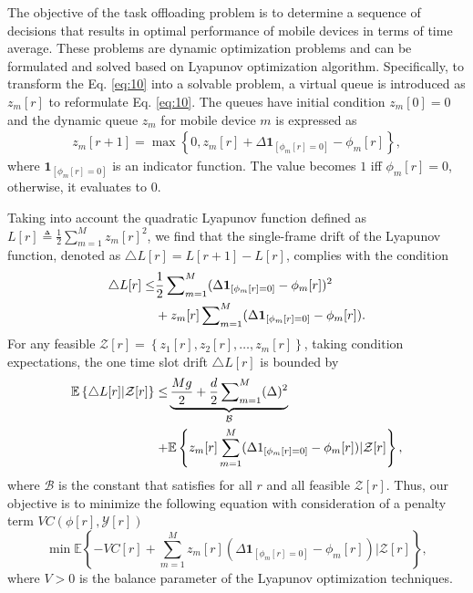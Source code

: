 \documentclass[journal]{IEEEtran}
\begin{document}
The objective of the task offloading problem is to determine a sequence of decisions that results in optimal performance of mobile devices in terms of time average.
These problems are dynamic optimization problems and can be formulated and solved based on Lyapunov optimization algorithm.
Specifically, to transform the Eq. \eqref{eq:10} into a solvable problem, a virtual queue is introduced as $z_m[r]$ to reformulate Eq. \eqref{eq:10}.
The queues have initial condition $z_m[0]=0$ and the dynamic queue $z_m$ for mobile device $m$ is expressed as
\begin{align}\label{eq:12-1}
z_m[r+1]=\max\left\{0,z_m[r]+\Delta{\boldsymbol 1}_{\left[\phi_m[r]=0\right]}-\phi_m[r]\right\},
\end{align}
where ${\boldsymbol 1}_{\left[\phi_m[r]=0\right]}$ is an indicator function. The value becomes $1$ iff $\phi_m[r]=0$, otherwise, it evaluates to $0$.

Taking into account the quadratic Lyapunov function defined as $L[r]\triangleq \frac{1}{2} \sum_{m=1}^{M}z_m[r]^2$, we find that the single-frame drift of the Lyapunov function, denoted as $\triangle L[r]=L[r+1]-L[r]$, complies with the condition
\begin{align}
\triangle L[r] \le& \frac{1}{2}\sum\nolimits_{m=1}^{M}(\Delta {\boldsymbol 1}_{[\phi_m[r]=0]}-\phi_m[r])^2\\
&+z_m[r]\sum\nolimits_{m=1}^{M}(\Delta {\boldsymbol 1}_{[\phi_m[r]=0]}-\phi_m[r]).\notag
\end{align}
For any feasible $\mathcal{Z}[r]=\left\{z_1[r],z_2[r],\dots,z_m[r]\right\}$, taking condition expectations, the one time slot drift $\triangle L[r]$ is bounded by
\begin{align} \label{eq:15}
    \mathbb{E}\left\{\triangle L[r]|\mathcal{Z}[r]\right\} \le&
    \underbrace{\frac{Mg}{2}+\frac{d}{2}\sum\nolimits_{m=1}^{M}(\Delta)^2}_{\mathcal{B}}\\+&\mathbb{E}\left\{z_m[r]\sum_{m=1}^{M}(\Delta 1_{[\phi_m[r]=0]}-\phi_m[r])|\mathcal{Z}[r]\right\},\notag
\end{align}
where $\mathcal{B}$ is the constant that satisfies for all $r$ and all feasible $\mathcal{Z}[r]$.
Thus, our objective is to minimize the following equation with consideration of a penalty term $VC(\mathcal{\phi}[r],\mathcal{Y}[r])$
\begin{equation}\label{eq:14}
    \min \mathbb{E}\left\{-VC[r]+\sum_{m=1}^Mz_m[r](\Delta{\boldsymbol 1}_{[\phi_m[r]=0]}-\phi_m[r])|\mathcal{Z}[r]\right\},
\end{equation}
where $V>0$ is the balance parameter of the Lyapunov optimization techniques.
\end{document}
